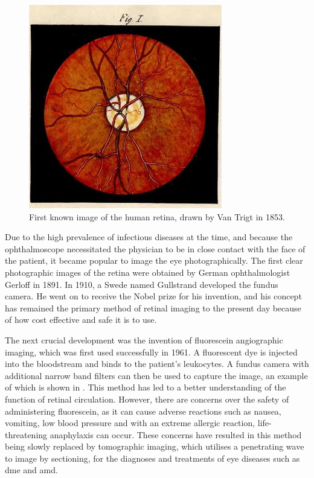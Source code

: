 \begin{figure}[H]
\centering
  \includegraphics{figures/first_human_retina}
\caption{First known image of the human retina, drawn by Van Trigt in 1853.\cite{van1853dissertatio}}
\label{fig:human_retina}
\end{figure}

Due to the high prevalence of infectious diseases at the time, and because
the ophthalmoscope necessitated the physician to be in close contact with
the face of the patient, it became popular to image the eye photographically.
The first clear photographic images of the retina were obtained by German ophthalmologist Gerloff in 1891.\cite{gerloffphoto}  In 1910, a Swede named
Gullstrand developed the fundus camera.\cite{gullstrandcamera}  He went on
to receive the Nobel prize for his invention, and his concept has remained the
primary method of retinal imaging to the present day because of how cost
effective and safe it is to use.\cite{ravin1999gullstrand}

The next crucial development was the invention of fluorescein angiographic
imaging, which was first used successfully in 1961.\cite{novotny1961method}
A fluorescent dye is injected into the bloodstream and binds to the patient's
leukocytes.\cite{novotny1961method}  A fundus camera with additional
narrow band filters can then be used to capture the image, an example of
which is shown in . This method has led to a
better understanding of the function of retinal circulation. However, there are
concerns over the safety of administering fluorescein, as it can cause adverse
reactions such as nausea, vomiting, low blood pressure and with an extreme
allergic reaction, life-threatening anaphylaxis can occur.
\cite{lopez1998fluorescein,kwan2006fluorescein} These concerns have resulted
in this method being slowly replaced by tomographic imaging, which utilises
a penetrating wave to image by sectioning, for the diagnoses and treatments
of eye diseases such as \gls{dme} and
\gls{amd}.

